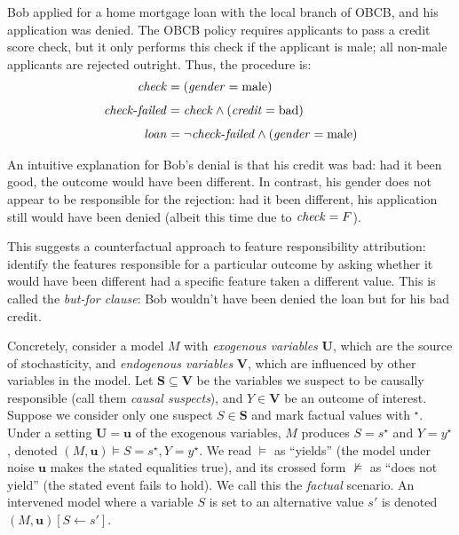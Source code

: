 \begin{example} \label{example:bobatobcb}
Bob applied for a home mortgage loan with the local branch of OBCB, and his application was denied.
The OBCB policy requires applicants to pass a credit score check, but it only performs this check if the applicant is male; all non-male applicants are rejected outright. \label{ex:obcb} Thus, the procedure is:
\begin{align*}
\varname{check} &= (\varname{gender} = \text{male}) \\[4pt]
\varname{check\text{-}failed} &= \varname{check} \land (\varname{credit} = \text{bad}) \\[4pt]
\varname{loan} &= \lnot \varname{check\text{-}failed} \land (\varname{gender} = \text{male})
\end{align*}
\end{example}

\noindent An intuitive explanation for Bob's denial is that his credit was bad: had it been good, the outcome would have been different.
In contrast, his gender does not appear to be responsible for the rejection: had it been different,
his application still would have been denied (albeit this time due to $\varname{check}=F$).

This suggests a counterfactual approach to feature responsibility attribution: identify the features responsible for a particular outcome by asking whether it would have been different had a specific feature taken a different value.
This is called the \textit{but-for clause}: Bob wouldn’t have been denied the loan but for his bad credit.

Concretely, consider a model $M$ with \emph{exogenous variables} $\mathbf{U}$, which are the source of stochasticity, and \emph{endogenous variables} $\mathbf{V}$,  which are influenced by other variables in the model. 
Let $\mathbf{S} \subseteq \mathbf{V}$ be the variables we suspect to be causally responsible (call them \emph{causal suspects}), and 
$Y \in  \mathbf{V}$ be an outcome of interest. 
Suppose we consider only one suspect $S \in \mathbf{S}$ and mark factual values with $^\star$. 
Under a setting $\mathbf{U} = \mathbf{u}$ of the exogenous variables, $M$ produces $S = s^\star$ and $Y = y^\star$, denoted $(M, \mathbf{u}) \vDash S=s^\star, Y=y^\star$. We read $\vDash$ as ``yields'' (the model under noise $\mathbf{u}$ makes the stated equalities true), and its crossed form $\not\vDash$ as ``does not yield'' (the stated event fails to hold).
We call this the \emph{factual} scenario.
An intervened model where a variable $S$ is set to an alternative value $s'$ is denoted $(M, \mathbf{u})[S \leftarrow s']$.

